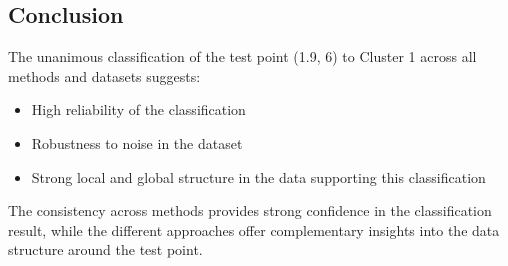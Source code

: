 \documentclass[12pt]{article}
\begin{document}
\subsection{Conclusion}
The unanimous classification of the test point (1.9, 6) to Cluster 1 across all methods and datasets suggests:
\begin{itemize}
    \item High reliability of the classification
    \item Robustness to noise in the dataset
    \item Strong local and global structure in the data supporting this classification
\end{itemize}

The consistency across methods provides strong confidence in the classification result, while the different approaches offer complementary insights into the data structure around the test point.
\end{document}
